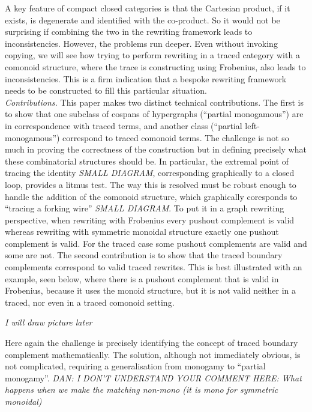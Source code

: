 A key feature of compact closed categories is that the Cartesian product, if it exists, is degenerate and identified with the co-product. So it would not be surprising if combining the two in the rewriting framework leads to inconsistencies. However, the problems run deeper. Even without invoking copying, we will see how trying to perform rewriting in a traced category with a comonoid structure, where the trace is constructing using Frobenius, also leads to inconsistencies. This is a firm indication that a bespoke rewriting framework needs to be constructed to fill this particular situation. 
\\[1.5ex]
\emph{Contributions.} This paper makes two distinct technical contributions. The first is to show that one subclass of cospans of hypergraphs (``partial monogamous'') are in correspondence with traced terms, and another class (``partial left-monogamous'') correspond to traced comonoid terms. The challenge is not so much in proving the correctness of the construction but in defining precisely what these combinatorial structures should be. In particular, the extremal point of tracing the identity \emph{SMALL DIAGRAM}, corresponding graphically to a closed loop, provides a litmus test. The way this is resolved must be robust enough to handle the addition of the comonoid structure, which graphically coresponds to ``tracing a forking wire'' \emph{SMALL DIAGRAM}. To put it in a graph rewriting perspective, when rewriting with Frobenius every pushout complement is valid whereas rewriting with symmetric monoidal structure exactly one pushout complement is valid. For the traced case some pushout complements are valid and some are not. 
The second contribution is to show that the traced boundary complements correspond to valid traced rewrites. This is best illustrated with an example, seen below, where there is a pushout complement that is valid in Frobenius, because it uses the monoid structure, but it is not valid neither in a traced, nor even in a traced comonoid setting. 

        \emph{I will draw picture later}

Here again the challenge is precisely identifying the concept of traced boundary complement mathematically. The solution, although not immediately obvious, is not complicated, requiring a generalisation from monogamy to ``partial monogamy''. \emph{DAN: I DON'T UNDERSTAND YOUR COMMENT HERE: What happens when we make the matching non-mono (it is mono for symmetric monoidal)}
